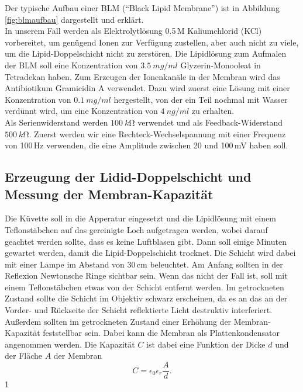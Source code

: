 \documentclass[a4paper,ngerman]{scrartcl}
\begin{document}
Der typische Aufbau einer BLM ("`Black Lipid Membrane"') ist in Abbildung \ref{fig:blmaufbau} dargestellt und erklärt. \\

In unserem Fall werden als Elektrolytlösung 0.5\,M Kaliumchlorid (KCl) vorbereitet, um genügend Ionen zur Verfügung zustellen, aber auch nicht zu viele, um die Lipid-Doppelschicht nicht zu zerstören. Die Lipidlösung zum Aufmalen der BLM soll eine Konzentration von 
$\SI{3,5}{mg/ml}$ Glyzerin-Monooleat in Tetradekan haben. Zum Erzeugen der Ionenkanäle in der Membran wird das Antibiotikum Gramicidin A verwendet. Dazu wird zuerst eine
Lösung mit einer Konzentration von $\SI{0,1}{mg/ml}$ hergestellt, von der ein Teil nochmal mit Wasser verdünnt wird, um eine Konzentration von
$\SI{4}{ng/ml}$ zu erhalten. \\

Als Serienwiderstand werden $\SI{100}{k\ohm}$ verwendet und als Feedback-Widerstand $\SI{500}{k\ohm}$. Zuerst werden wir eine 
Rechteck-Wechselspannung mit einer Frequenz von 100\,Hz verwenden, die eine Amplitude zwischen 20 und 100\,mV haben soll. \\



\subsection{Erzeugung der Lidid-Doppelschicht und Messung der Membran-Kapazität}
\label{sec:capacity}
Die Küvette soll in die Apperatur eingesetzt und die Lipidlösung mit einem Teflonstäbchen auf das gereinigte Loch aufgetragen werden, wobei darauf geachtet werden sollte, dass es keine Luftblasen gibt.
Dann soll einige Minuten gewartet werden, damit die Lipid-Doppelschicht trocknet. Die Schicht wird dabei mit einer Lampe im Abstand
von 30\,cm beleuchtet. Am Anfang sollten in der Reflexion Newtonsche Ringe sichtbar sein. Wenn das nicht der Fall ist, soll mit einem
Teflonstäbchen etwas von der Schicht entfernt werden. Im getrockneten Zustand sollte die Schicht im Objektiv schwarz erscheinen, da es 
an das an der Vorder- und Rückseite der Schicht reflektierte Licht destruktiv interferiert. Außerdem sollten im getrockneten Zustand 
einer Erhöhung der Membran-Kapazität feststellbar sein. Dabei kann die Membran als Plattenkondensator angenommen werden. Die Kapazität $C$
ist dabei eine Funktion der Dicke $d$ und der Fläche $A$ der Membran
\begin{equation}
C = \epsilon_0 \epsilon_r \frac{A}{d}.
\end{equation}1
\end{document}
